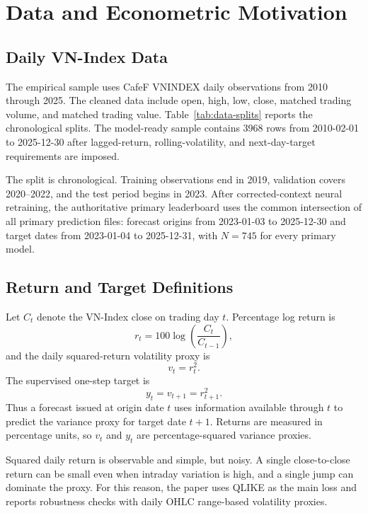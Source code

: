 \section{Data and Econometric Motivation}

\subsection{Daily VN-Index Data}

The empirical sample uses CafeF VNINDEX daily observations from 2010 through 2025. The cleaned data include open, high, low, close, matched trading volume, and matched trading value. Table~\ref{tab:data-splits} reports the chronological splits. The model-ready sample contains 3968 rows from 2010-02-01 to 2025-12-30 after lagged-return, rolling-volatility, and next-day-target requirements are imposed.



The split is chronological. Training observations end in 2019, validation covers 2020--2022, and the test period begins in 2023. After corrected-context neural retraining, the authoritative primary leaderboard uses the common intersection of all primary prediction files: forecast origins from 2023-01-03 to 2025-12-30 and target dates from 2023-01-04 to 2025-12-31, with \(N=745\) for every primary model.

\subsection{Return and Target Definitions}

Let \(C_t\) denote the VN-Index close on trading day \(t\). Percentage log return is
\begin{equation}
r_t = 100 \log\left(\frac{C_t}{C_{t-1}}\right),
\end{equation}
and the daily squared-return volatility proxy is
\begin{equation}
v_t = r_t^2.
\end{equation}
The supervised one-step target is
\begin{equation}
y_t = v_{t+1}=r_{t+1}^{2}.
\end{equation}
Thus a forecast issued at origin date \(t\) uses information available through \(t\) to predict the variance proxy for target date \(t+1\). Returns are measured in percentage units, so \(v_t\) and \(y_t\) are percentage-squared variance proxies.

Squared daily return is observable and simple, but noisy. A single close-to-close return can be small even when intraday variation is high, and a single jump can dominate the proxy. For this reason, the paper uses QLIKE as the main loss and reports robustness checks with daily OHLC range-based volatility proxies.

